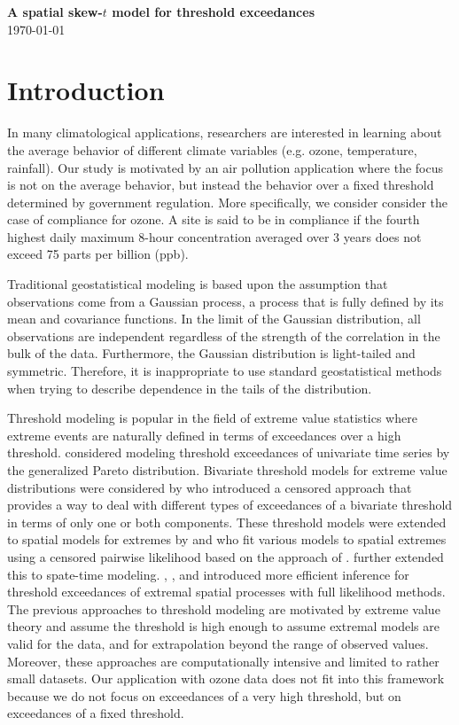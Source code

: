 \documentclass[11pt]{article}
\begin{document}
\linenumbers

\begin{center}
{\Large {\bf A spatial skew-$t$ model for threshold exceedances}}\\
\today
\end{center}

\section{Introduction}\label{s:intro}
In many climatological applications, researchers are interested in learning about the average behavior of different climate variables (e.g. ozone, temperature, rainfall).
Our study is motivated by an air pollution application where the focus is not on the average behavior, but instead the behavior over a fixed threshold determined by government regulation.
More specifically, we consider consider the case of compliance for ozone.
A site is said to be in compliance if the fourth highest daily maximum 8-hour concentration averaged over 3 years does not exceed 75 parts per billion (ppb).

Traditional geostatistical modeling is based upon the assumption that observations come from a Gaussian process, a process that is fully defined by its mean and covariance functions.
In the limit of the Gaussian distribution, all observations are independent regardless of the strength of the correlation in the bulk of the data.
Furthermore, the Gaussian distribution is light-tailed and symmetric.
Therefore, it is inappropriate to use standard geostatistical methods when trying to describe dependence in the tails of the distribution.

Threshold modeling is popular in the field of extreme value statistics where extreme events are naturally defined in terms of exceedances over a high threshold.
\citet{Davison1990} considered modeling threshold exceedances of univariate time series by the generalized Pareto distribution.
Bivariate threshold models for extreme value distributions were considered by \citet{Ledford1996} who introduced a censored approach that provides a way to deal with different types of exceedances of a bivariate threshold in terms of only one or both components.
These threshold models were extended to spatial models for extremes by \citet{Wadsworth2012} and \citet{Thibaud2013} who fit various models to spatial extremes using a censored pairwise likelihood \citep{Padoan2010} based on the approach of \citet{Ledford1996}.
\citet{Huser2014} further extended this to spate-time modeling.
\citet{Engelke2014}, \citet{Wadsworth2014}, and \citet{Thibaud2013a} introduced more efficient inference for threshold exceedances of extremal spatial processes with full likelihood methods.
The previous approaches to threshold modeling are motivated by extreme value theory and assume the threshold is high enough to assume extremal models are valid for the data, and for extrapolation beyond the range of observed values.
Moreover, these approaches are computationally intensive and limited to rather small datasets.
Our application with ozone data does not fit into this framework because we do not focus on exceedances of a very high threshold, but on exceedances of a fixed threshold.
\end{document}
